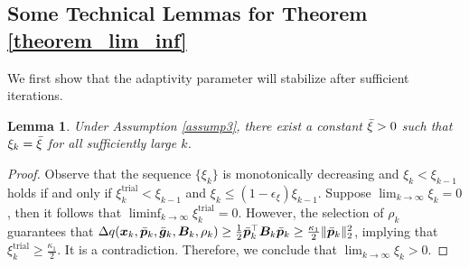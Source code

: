 \documentclass[aos]{imsart}
\numberwithin{equation}{section}
\theoremstyle{plain}
\newtheorem{lemma}{Lemma}
\begin{document}
\begin{appendix}
\subsection{Some Technical Lemmas for Theorem \ref{theorem_lim_inf}}
We first show that the adaptivity parameter will stabilize after sufficient iterations.
\begin{lemma}
\label{lemma18}
    Under Assumption \ref{assump3}, there exist a constant $\Bar{\xi} > 0$ such that $\xi_k = \Bar{\xi}$ for all sufficiently large $k$.
\end{lemma}

\begin{proof}
    Observe that the sequence $\{\xi_k\}$ is monotonically decreasing and $\xi_{k} < \xi_{k-1}$ holds if and only if $\xi_{k}^{\text{trial}} < \xi_{k-1}$ and $\xi_k \leq (1-\epsilon_{\xi}) \xi_{k-1}$. Suppose $\lim_{k \to \infty} \xi_k = 0$, then it follows that $\mathop{\lim \inf}_{k \to \infty} \xi_k^{\text{trial}} = 0$. However, the selection of $\rho_k$ guarantees that $\Delta q(\bm{x}_k,\Bar{\bm{p}}_k,  \Bar{\bm{g}}_{k},\bm{B}_k,\rho_k) \geq \frac{1}{2} \Bar{\bm{p}}_k^{\top} \bm{B}_k \Bar{\bm{p}}_k \geq \frac{\kappa_1}{2} \|\Bar{\bm{p}}_k\|_2^2$, implying that $\xi_k^{\text{trial}} \geq \frac{\kappa_1}{2}$. It is a contradiction. Therefore, we conclude that $\lim_{k \to \infty} \xi_k > 0$. 
\end{proof}


\end{appendix}
\end{document}

